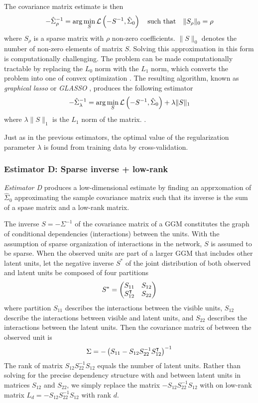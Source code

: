The covariance matrix estimate is then 
\begin{equation}
-\hat\Sigma_\rho^{-1} =\arg\min\limits_S \mathcal L\left(-S^{-1},\hat\Sigma_0\right)  \quad \mbox{such that} \quad  \|S_\rho\|_0 = \rho
\end{equation}
where $S_\rho$ is a sparse matrix with $\rho$ non-zero coefficients. $\|S\|_0$ denotes the number of non-zero elements of matrix $S$.
Solving this approximation in this form is computationally challenging. The problem can be made computationally tractable by replacing the $L_0$ norm with the $L_1$ norm, which converts the problem into one of convex optimization \cite{Donoho:2000}.  The resulting algorithm, known as \emph{graphical lasso} or \emph{GLASSO}  \cite{Meinshausen:2006,Yuan:2007,Banerjee:2008,Friedman:2008}, produces the following estimator  
\begin{equation}
-\hat\Sigma_\lambda^{-1} = \arg\min\limits_S \mathcal L\left(-S^{-1},\hat\Sigma_0\right) + \lambda \|S\|_1
\end{equation}
where $\lambda \|S\|_1$ is the $L_1$ norm of the matrix. .

Just as in the previous estimators, the optimal value of the regularization parameter $\lambda$ is found from training data by cross-validation.

\subsubsection*{Estimator D: Sparse inverse + low-rank}
\emph{Estimator D} produces a low-dimensional estimate by finding an apprxomation of $\hat\Sigma_0$ approximating the sample covariance matrix such that its inverse is the sum of a spase matrix and a low-rank matrix. 

The inverse $S=-\Sigma^{-1}$ of the covariance matrix of a GGM constitutes the graph of conditional dependencies (interactions) between the units.  With the assumption of sparse organization of interactions in the network, $S$ is assumed to be sparse.  When the observed units are part of a larger GGM that includes other latent units, let the negative inverse $S^*$ of the joint distribution of both observed and latent units be composed of four partitions
\begin{equation}
S^* = 
\begin{pmatrix}
S_{11} & S_{12} \\
S_{12}^\intercal & S_{22} 
\end{pmatrix}
\end{equation}
where partition $S_{11}$ describes the interactions between the visible units, $S_{12}$ describe the interactions between visible and latent units, and $S_{22}$ describes the interactions between the latent units. 
Then the covariance matrix of between the observed unit is 
\begin{equation}
\Sigma = -\left(S_{11} - S_{12}S_{22}^{-1}S_{12}^\intercal\right)^{-1}
\end{equation} 
The rank of matrix $S_{12}S_{22}^{-1}S_{12}$ equals the number of latent units. Rather than solving for the precise dependency structure with and between latent units in matrices $S_{12}$ and $S_{22}$, we simply replace the matrix $- S_{12}S_{22}^{-1}S_{12}$ with on low-rank matrix $L_d=- S_{12}S_{22}^{-1}S_{12}$ with rank $d$.

